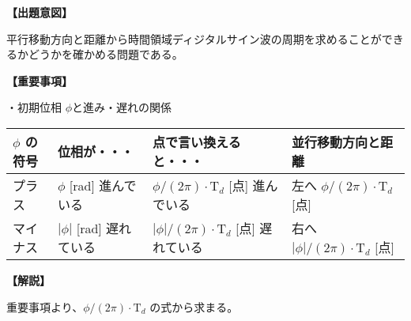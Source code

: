 \noindent \textbf{【出題意図】}

\bigskip
\noindent 平行移動方向と距離から時間領域ディジタルサイン波の周期を求めることができるかどうかを確かめる問題である。

\vspace{1em}
\noindent \textbf{【重要事項】}

\noindent ・初期位相 $\phi$と進み・遅れの関係

\medskip
\begin{center}
\small
\begin{tabularx}{0.9\fbwidth}{|X|X|X|X|}
\hline
$\phi$ の符号&  位相が・・・   & 点で言い換えると・・・   & 並行移動方向と距離 \\
\hline
プラス &  $\phi$ [rad] 進んでいる & $\phi/(2\pi) \cdot \textrm{T}_d$ [点] 進んでいる & 左へ $\phi/(2\pi) \cdot \textrm{T}_d$ [点] \\
\hline
マイナス &  $|\phi|$ [rad] 遅れている & $|\phi|/(2\pi) \cdot \textrm{T}_d$ [点] 遅れている & 右へ $|\phi|/(2\pi) \cdot \textrm{T}_d$ [点] \\
\hline
\end{tabularx}
\end{center}

\bigskip

\vspace{1em}
\noindent \textbf{【解説】}

\bigskip
\noindent 重要事項より、$\phi/(2\pi) \cdot \textrm{T}_d$ の式から求まる。
